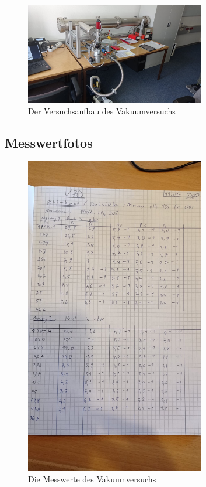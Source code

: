 \begin{figure}[h]
    \centering
    \includegraphics[width=0.7\textwidth]{latex/images/Aufbau.jpeg}
    \caption{Der Versuchsaufbau des Vakuumversuchs}
\end{figure}

\subsection*{Messwertfotos}

\begin{figure}[h]
    \centering
    \includegraphics[width=0.7\textwidth]{latex/images/Messwerte_1.jpeg}
    \caption{Die Messwerte des Vakuumversuchs}
\end{figure}

